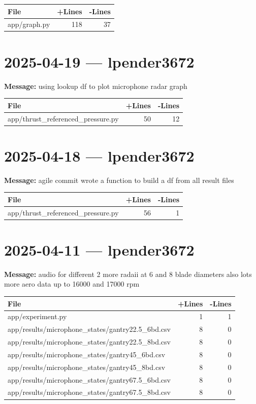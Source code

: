 \documentclass{article}
\begin{document}
\begin{longtable}{|p{10cm}|r|r|}
\hline \textbf{File} & \textbf{+Lines} & \textbf{-Lines} \\
\hline
app/graph.py & 118 & 37 \\
\hline
\end{longtable}

\section*{2025-04-19 --- lpender3672}
\textbf{Message:} using lookup df to plot microphone radar graph

\begin{longtable}{|p{10cm}|r|r|}
\hline \textbf{File} & \textbf{+Lines} & \textbf{-Lines} \\
\hline
app/thrust\_referenced\_pressure.py & 50 & 12 \\
\hline
\end{longtable}

\section*{2025-04-18 --- lpender3672}
\textbf{Message:} agile commit wrote a function to build a df from all result files

\begin{longtable}{|p{10cm}|r|r|}
\hline \textbf{File} & \textbf{+Lines} & \textbf{-Lines} \\
\hline
app/thrust\_referenced\_pressure.py & 56 & 1 \\
\hline
\end{longtable}

\section*{2025-04-11 --- lpender3672}
\textbf{Message:} audio for different 2 more radaii at 6 and 8 blade diameters also lots more aero data up to 16000 and 17000 rpm

\begin{longtable}{|p{10cm}|r|r|}
\hline \textbf{File} & \textbf{+Lines} & \textbf{-Lines} \\
\hline
app/experiment.py & 1 & 1 \\
\hline
app/results/microphone\_states/gantry22.5\_6bd.csv & 8 & 0 \\
\hline
app/results/microphone\_states/gantry22.5\_8bd.csv & 8 & 0 \\
\hline
app/results/microphone\_states/gantry45\_6bd.csv & 8 & 0 \\
\hline
app/results/microphone\_states/gantry45\_8bd.csv & 8 & 0 \\
\hline
app/results/microphone\_states/gantry67.5\_6bd.csv & 8 & 0 \\
\hline
app/results/microphone\_states/gantry67.5\_8bd.csv & 8 & 0 \\
\hline
\end{longtable}
\end{document}
